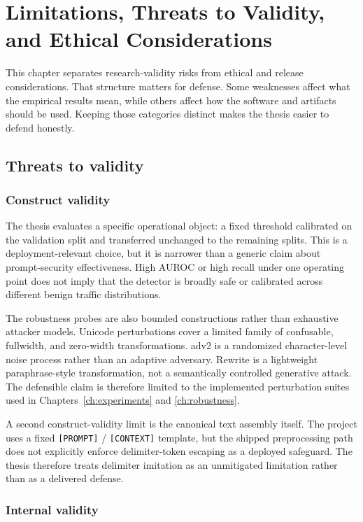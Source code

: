 \chapter{Limitations, Threats to Validity, and Ethical Considerations}
\label{ch:limitations_ethics}

This chapter separates research-validity risks from ethical and release considerations. That structure matters for defense. Some weaknesses affect what the empirical results mean, while others affect how the software and artifacts should be used. Keeping those categories distinct makes the thesis easier to defend honestly.

\section{Threats to validity}

\subsection{Construct validity}

The thesis evaluates a specific operational object: a fixed threshold calibrated on the validation split and transferred unchanged to the remaining splits. This is a deployment-relevant choice, but it is narrower than a generic claim about prompt-security effectiveness. High AUROC or high recall under one operating point does not imply that the detector is broadly safe or calibrated across different benign traffic distributions.

The robustness probes are also bounded constructions rather than exhaustive attacker models. Unicode perturbations cover a limited family of confusable, fullwidth, and zero-width transformations. adv2 is a randomized character-level noise process rather than an adaptive adversary. Rewrite is a lightweight paraphrase-style transformation, not a semantically controlled generative attack. The defensible claim is therefore limited to the implemented perturbation suites used in Chapters~\ref{ch:experiments} and \ref{ch:robustness}.

A second construct-validity limit is the canonical text assembly itself. The project uses a fixed \texttt{[PROMPT]} / \texttt{[CONTEXT]} template, but the shipped preprocessing path does not explicitly enforce delimiter-token escaping as a deployed safeguard. The thesis therefore treats delimiter imitation as an unmitigated limitation rather than as a delivered defense.

\subsection{Internal validity}


